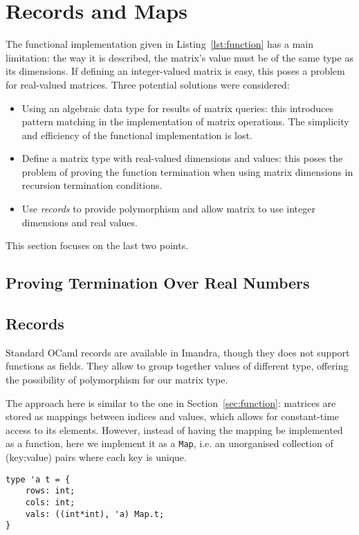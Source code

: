 \documentclass[runningheads]{llncs}
\begin{document}
\section{Records and Maps}\label{sec:records}

The functional implementation given in Listing~\ref{lst:function} has a main limitation: the way it is described, the matrix's value must be of the same type as its dimensions. If defining an integer-valued matrix is easy, this poses a problem for real-valued matrices. Three potential solutions were considered:
\begin{itemize}
	\item Using an algebraic data type for results of matrix queries: this introduces pattern matching in the implementation of matrix operations. The simplicity and efficiency of the functional implementation is lost.
	\item Define a matrix type with real-valued dimensions and values: this poses the problem of proving the function termination when using matrix dimensions in recursion termination conditions.
	\item Use \emph{records} to provide polymorphism and allow matrix to use integer dimensions and real values.
\end{itemize}

This section focuses on the last two points.

\subsection{Proving Termination Over Real Numbers}

\subsection{Records}

Standard OCaml records are available in Imandra, though they does not support functions as fields. They allow to group together values of different type, offering the possibility of polymorphism for our matrix type. 

The approach here is similar to the one in Section~\ref{sec:function}: matrices are stored as mappings between indices and values, which allows for constant-time access to its elements. However, instead of having the mapping be implemented as a function, here we implement it as a \lstinline{Map}, i.e. an unorganised collection of (key;value) pairs where each key is unique. 

\begin{lstlisting}[language=caml]
type 'a t = {
	rows: int;
	cols: int;
	vals: ((int*int), 'a) Map.t;
}
\end{lstlisting}
\end{document}
